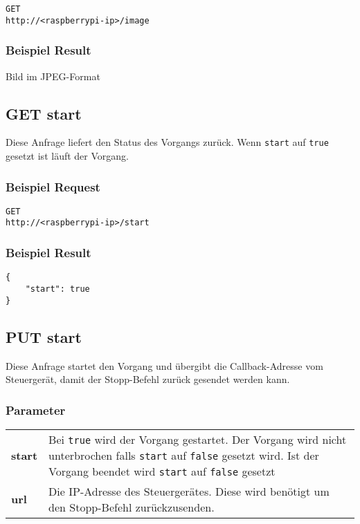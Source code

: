 \texttt{GET} \\
\texttt{http://<raspberrypi-ip>/image}

\subsubsection{Beispiel Result}

Bild im JPEG-Format

\subsection{GET start}

Diese Anfrage liefert den Status des Vorgangs zurück. Wenn \texttt{start} auf \texttt{true} gesetzt ist läuft der Vorgang.

\subsubsection{Beispiel Request}

\texttt{GET} \\
\texttt{http://<raspberrypi-ip>/start}

\subsubsection{Beispiel Result}

\begin{lstlisting}[caption=GET start Result, tabsize=2]
{
	"start": true
}
\end{lstlisting}

\subsection{PUT start}

Diese Anfrage startet den Vorgang und übergibt die Callback-Adresse vom Steuergerät, damit der Stopp-Befehl zurück gesendet werden kann.

\subsubsection{Parameter}

\begin{tabular}{l p{16cm}}
	\textbf{start} & Bei \texttt{true} wird der Vorgang gestartet. Der Vorgang wird nicht unterbrochen falls \texttt{start} auf \texttt{false} gesetzt wird. Ist der Vorgang beendet wird \texttt{start} auf \texttt{false} gesetzt \\
	\textbf{url} & Die IP-Adresse des Steuergerätes. Diese wird benötigt um den Stopp-Befehl zurückzusenden.
\end{tabular}

